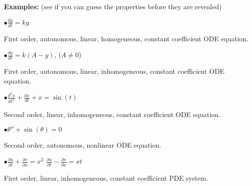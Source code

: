 \documentclass[10pt,aspectratio=169]{beamer}
\begin{document}
\begin{frame}
\textbf{Examples:} (see if you can guess the properties before they are
revealed)

\medskip
\pause

$\bullet$\quad$\displaystyle
\frac{d y}{dt} = ky$

\medskip
\pause

First order, autonomous, linear, homogeneous, constant coefficient ODE
equation.

\medskip
\pause

$\bullet$\quad$\displaystyle
\frac{d y}{dt} = k(A-y)$,
\qquad ($A\not=0$)

\medskip
\pause

First order, autonomous, linear, inhomogeneous, constant coefficient ODE
equation.

\medskip
\pause

$\bullet$\quad$\displaystyle
\frac{d^2 x}{dt^2} + \frac{dx}{dt} + x = \sin(t)$

\medskip
\pause

Second order, linear, inhomogeneous, constant coefficient ODE equation.

\medskip
\pause

$\bullet$\quad$\displaystyle
\theta'' + \sin(\theta) = 0$

\medskip
\pause

Second order, autonomous, nonlinear ODE equation.

\medskip
\pause

$\bullet$\quad$\displaystyle
\frac{\partial u}{\partial t} + \frac{\partial v}{\partial x} = x^2$
\qquad
$\displaystyle
\frac{\partial u}{\partial t} - \frac{\partial v}{\partial x} = xt$

\medskip
\pause

First order, linear, inhomogeneous, constant coefficient PDE system.

\end{frame}
\end{document}
